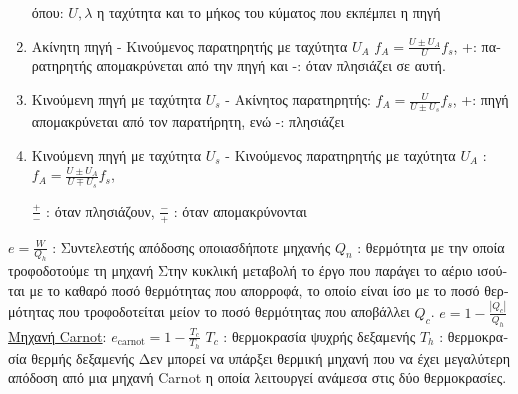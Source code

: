 \documentclass[12pt]{article}
\begin{document}
\begin{flushleft}
\begin{enumerate}
	\textgreek{όπου}: $U, \lambda$ \textgreek{η ταχύτητα και το μήκος του κύματος που εκπέμπει η πηγή}
	\item \textgreek{Ακίνητη πηγή - Κινούμενος παρατηρητής με ταχύτητα} $U_A$ \linebreak
	$\displaystyle f_A = \frac{U \pm U_A}{U} f_s $, +: \textgreek{παρατηρητής απομακρύνεται από την πηγή και -: όταν πλησιάζει σε αυτή.} \linebreak 
	\item \textgreek{Κινούμενη πηγή με ταχύτητα} $U_s$ - \textgreek{Ακίνητος παρατηρητής:}
	$\displaystyle f_A = \frac{U}{U\pm U_s} f_s$, +: \textgreek{πηγή απομακρύνεται από τον παρατήρητη, ενώ -: πλησιάζει}
	\item \textgreek{Κινούμενη πηγή με ταχύτητα} $U_s$ - \textgreek{Κινούμενος παρατηρητής με ταχύτητα} $U_A$  : \linebreak 
	$\displaystyle f_A = \frac{U \pm U_A}{U \mp U_s} f_s$, \begin{small}
	$\displaystyle \frac{+}{-}$  :  \textgreek{όταν πλησιάζουν}, $\displaystyle \frac{-}{+}$  :  \textgreek{όταν απομακρύνονται} 
	\end{small} \linebreak 
	\end{enumerate} 
	
	\textbullet \quad $\displaystyle e = \frac{W}{Q_h}$  :  \textgreek{Συντελεστής απόδοσης οποιασδήποτε μηχανής} \linebreak 
	$Q_n$  :  \textgreek{θερμότητα με την οποία τροφοδοτούμε τη μηχανή} \linebreak 
	\textbullet \quad \textgreek{Στην κυκλική μεταβολή το έργο που παράγει το αέριο ισούται με το καθαρό ποσό θερμότητας που απορροφά, το οποίο είναι ίσο με το ποσό θερμότητας που τροφοδοτείται μείον το ποσό θερμότητας που αποβάλλει} $Q_c$. \linebreak 
	$\displaystyle e= 1 -\frac{|Q_c|}{Q_h}$ \linebreak 
	\textbullet \quad \uline{\textgreek{Μηχανή} Carnot}: $\displaystyle e_{\text{carnot}} = 1 - \frac{T_c}{T_h}$ \linebreak 
	$T_c$  :  \textgreek{θερμοκρασία ψυχρής δεξαμενής} \linebreak 
	$T_h$  :  \textgreek{θερμοκρασία θερμής δεξαμενής} \linebreak 
	\textgreek{Δεν μπορεί να υπάρξει θερμική μηχανή που να έχει μεγαλύτερη απόδοση από μια μηχανή} Carnot \textgreek{η οποία λειτουργεί ανάμεσα στις δύο θερμοκρασίες}. \linebreak 
	

\end{flushleft}
\end{document}
